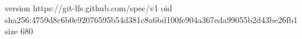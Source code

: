 version https://git-lfs.github.com/spec/v1
oid sha256:4759d8c6b0e92076595b54d381c8a6bd100fe904a367eda99055b2d43be26fb1
size 680
